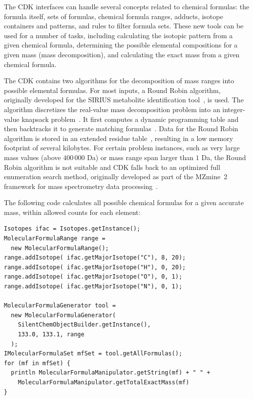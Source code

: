 \documentclass[10pt]{bmcart}
\begin{document}
The CDK interfaces can handle several concepts related to chemical formulas:
the formula itself, sets of formulas, chemical formula ranges, adducts, isotope
containers and patterns, and rules to filter formula sets. These new tools can
be used for a number of tasks, including calculating the isotopic pattern from
a given chemical formula, determining the possible elemental compositions for a
given mass (mass decomposition), and calculating the exact mass from a given
chemical formula.

The CDK contains two algorithms for the decomposition of mass ranges into
possible elemental formulas. For most inputs, a Round Robin algorithm,
originally developed for the SIRIUS metabolite identification
tool~\cite{Bocker2009}, is used. The algorithm discretizes the real-value mass
decomposition problem into an integer-value knapsack
problem~\cite{Martello1990}. It first computes a dynamic programming table and
then backtracks it to generate matching formulas~\cite{Duehrkop2013,
Boecker2008}. Data for the Round Robin algorithm is stored in an extended
residue table~\cite{Bocker2005}, resulting in a low memory footprint of several
kilobytes. For certain problem instances, such as very large mass values (above
$400\,000$ Da) or mass range span larger than $1$ Da, the Round Robin algorithm
is not suitable and CDK falls back to an optimized full enumeration search
method, originally developed as part of the MZmine~2 framework for mass
spectrometry data processing~\cite{Pluskal2012, Pluskal2010}.

The following code calculates all possible chemical formulas for a given
accurate mass, within allowed counts for each element:

\vspace{0.2cm}
\begin{verbatim}
Isotopes ifac = Isotopes.getInstance();
MolecularFormulaRange range =
  new MolecularFormulaRange();
range.addIsotope( ifac.getMajorIsotope("C"), 8, 20);
range.addIsotope( ifac.getMajorIsotope("H"), 0, 20);
range.addIsotope( ifac.getMajorIsotope("O"), 0, 1);
range.addIsotope( ifac.getMajorIsotope("N"), 0, 1);

MolecularFormulaGenerator tool =
  new MolecularFormulaGenerator(
    SilentChemObjectBuilder.getInstance(),
    133.0, 133.1, range
  );
IMolecularFormulaSet mfSet = tool.getAllFormulas();
for (mf in mfSet) {
  println MolecularFormulaManipulator.getString(mf) + " " +
    MolecularFormulaManipulator.getTotalExactMass(mf)
}
\end{verbatim}
\vspace{0.2cm}
\end{document}
